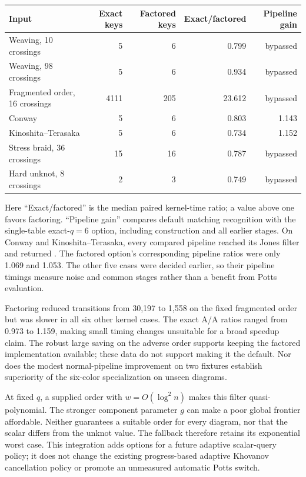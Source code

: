 \begin{center}\small
\begin{tabular}{lrrrr}
\toprule
Input & Exact keys & Factored keys & Exact/factored & Pipeline gain\\
\midrule
Weaving, 10 crossings & 5 & 6 & 0.799 & bypassed\\
Weaving, 98 crossings & 5 & 6 & 0.934 & bypassed\\
Fragmented order, 16 crossings & 4111 & 205 & 23.612 & bypassed\\
Conway & 5 & 6 & 0.803 & 1.143\\
Kinoshita--Terasaka & 5 & 6 & 0.734 & 1.152\\
Stress braid, 36 crossings & 15 & 16 & 0.787 & bypassed\\
Hard unknot, 8 crossings & 2 & 3 & 0.749 & bypassed\\
\bottomrule
\end{tabular}
\end{center}
Here ``Exact/factored'' is the median paired kernel-time ratio; a value
above one favors factoring. ``Pipeline gain'' compares default matching
recognition with the single-table exact-$q=6$ option, including construction
and all earlier stages. On Conway and Kinoshita--Terasaka, every compared
pipeline reached its Jones filter and returned . The factored
option's corresponding pipeline ratios were only 1.069 and 1.053.
The other five cases were decided earlier, so their pipeline timings measure
noise and common stages rather than a benefit from Potts evaluation.

Factoring reduced transitions from 30,197 to 1,558 on the fixed fragmented
order but was slower in all six other kernel cases. The exact A/A ratios
ranged from 0.973 to 1.159, making small timing changes unsuitable for a
broad speedup claim. The robust large saving on the adverse order supports
keeping the factored implementation available; these data do not support
making it the default. Nor does the modest normal-pipeline improvement on
two fixtures establish superiority of the six-color specialization on
unseen diagrams.

At fixed $q$, a supplied order with $w=O(\log^2 n)$ makes this filter
quasi-polynomial. The stronger component parameter $g$ can make a poor
global frontier affordable. Neither guarantees a suitable order for every
diagram, nor that the scalar differs from the unknot value. The fallback
therefore retains its exponential worst case. This integration adds options
for a future adaptive scalar-query policy; it does not change the existing
progress-based adaptive Khovanov cancellation policy or promote an unmeasured
automatic Potts switch.
